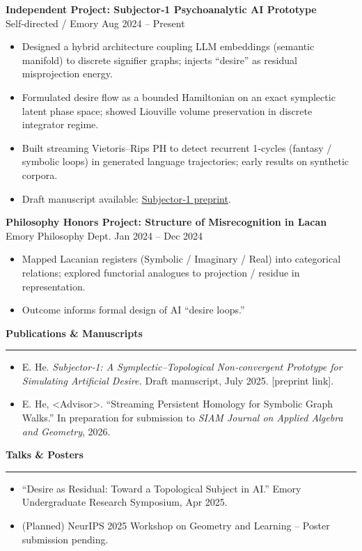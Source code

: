 \documentclass[11pt]{article}
\newcommand{\cvsection}[1]{%
  \vspace{1.25em}%
  \textbf{\large #1}%
  \vspace{0.5em}\hrule\vspace{0.6em}
}
\newcommand{\cvheading}[3]{\textbf{#1} \hfill #2 \hfill #3}
\newenvironment{cvitems}{\begin{itemize}[leftmargin=*,topsep=2pt,itemsep=2pt]}{\end{itemize}}
\begin{document}
\cvheading{Independent Project: Subjector‑1 Psychoanalytic AI Prototype}{Self‑directed / Emory}{Aug 2024 -- Present}
\begin{cvitems}
  \item Designed a hybrid architecture coupling LLM embeddings (semantic manifold) to discrete signifier graphs; injects “desire” as residual misprojection energy.
  \item Formulated desire flow as a bounded Hamiltonian on an exact symplectic latent phase space; showed Liouville volume preservation in discrete integrator regime.
  \item Built streaming Vietoris–Rips PH to detect recurrent 1‑cycles (fantasy / symbolic loops) in generated language trajectories; early results on synthetic corpora.
  \item Draft manuscript available: \href{https://your-site.example/subjector1.pdf}{Subjector‑1 preprint}.
\end{cvitems}

\cvheading{Philosophy Honors Project: Structure of Misrecognition in Lacan}{Emory Philosophy Dept.}{Jan 2024 -- Dec 2024}
\begin{cvitems}
  \item Mapped Lacanian registers (Symbolic / Imaginary / Real) into categorical relations; explored functorial analogues to projection / residue in representation.
  \item Outcome informs formal design of AI “desire loops.”
\end{cvitems}

\cvsection{Publications \& Manuscripts}
\begin{cvitems}
  \item E. He. \emph{Subjector‑1: A Symplectic–Topological Non‑convergent Prototype for Simulating Artificial Desire.} Draft manuscript, July 2025. [preprint link].
  \item E. He, <Advisor>. “Streaming Persistent Homology for Symbolic Graph Walks.” In preparation for submission to \emph{SIAM Journal on Applied Algebra and Geometry}, 2026.
\end{cvitems}

\cvsection{Talks \& Posters}
\begin{cvitems}
  \item “Desire as Residual: Toward a Topological Subject in AI.” Emory Undergraduate Research Symposium, Apr 2025.
  \item (Planned) NeurIPS 2025 Workshop on Geometry and Learning -- Poster submission pending.
\end{cvitems}
\end{document}
